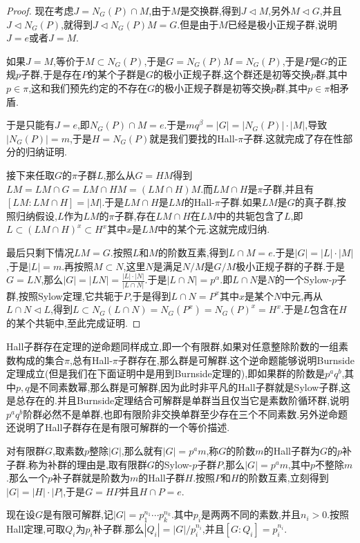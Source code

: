 \begin{proof}
	现在考虑$J=N_G(P)\cap M$,由于$M$是交换群,得到$J\triangleleft M$,另外$M\triangleleft G$,并且$J\triangleleft N_G(P)$,就得到$J\triangleleft N_G(P)M=G$.但是由于$M$已经是极小正规子群,说明$J={e}$或者$J=M$.
	
	如果$J=M$,等价于$M\subset N_G(P)$,于是$G=N_G(P)M=N_G(P)$,于是$P$是$G$的正规$p$子群,于是存在$P$的某个子群是$G$的极小正规子群,这个群还是初等交换$p$群,其中$p\in\pi$,这和我们预先约定的不存在$G$的极小正规子群是初等交换$p$群,其中$p\in\pi$相矛盾.
	
	于是只能有$J={e}$,即$N_G(P)\cap M={e}$.于是$mq^{\beta}=|G|=|N_G(P)|\cdot|M|$,导致$|N_G(P)|=m$,于是$H=N_G(P)$就是我们要找的Hall-$\pi$子群.这就完成了存在性部分的归纳证明.
	
	接下来任取$G$的$\pi$子群$L$,那么从$G=HM$得到$LM=LM\cap G=LM\cap HM=(LM\cap H)M$.而$LM\cap H$是$\pi$子群,并且有$[LM:LM\cap H]=|M|$.于是$LM\cap H$是$LM$的Hall-$\pi$子群.如果$LM$是$G$的真子群,按照归纳假设,$L$作为$LM$的$\pi$子群,存在$LM\cap H$在$LM$中的共轭包含了$L$,即$L\subset(LM\cap H)^x\subset H^x$其中$x$是$LM$中的某个元.这就完成归纳.
	
	最后只剩下情况$LM=G$.按照$L$和$M$的阶数互素,得到$L\cap M={e}$.于是$|G|=|L|\cdot|M|$,于是$|L|=m$.再按照$M\subset N$,这里$N$是满足$N/M$是$G/M$极小正规子群的子群.于是$G=LN$,那么$|G|=|LN|=\frac{|L|\cdot|N|}{|L\cap N|}$.于是$|L\cap N|=p^{\alpha}$.即$L\cap N$是$N$的一个Sylow-$p$子群,按照Sylow定理,它共轭于$P$,于是得到$L\cap N=P^x$其中$x$是某个$N$中元,再从$L\cap N\triangleleft L$,得到$L\subset N_G(L\cap N)=N_G(P^x)=N_G(P)^x=H^x$.于是$L$包含在$H$的某个共轭中,至此完成证明.
\end{proof}

Hall子群存在定理的逆命题同样成立,即一个有限群,如果对任意整除阶数的一组素数构成的集合$\pi$,总有Hall-$\pi$子群存在,那么群是可解群.这个逆命题能够说明Burnside定理成立(但是我们在下面证明中是用到Burnside定理的),即如果群的阶数是$p^aq^b$,其中$p,q$是不同素数幂,那么群是可解群,因为此时非平凡的Hall子群就是Sylow子群,这是总存在的.并且Burnside定理结合可解群是单群当且仅当它是素数阶循环群,说明$p^aq^b$阶群必然不是单群,也即有限阶非交换单群至少存在三个不同素数.另外逆命题还说明了Hall子群存在是有限可解群的一个等价描述.

对有限群$G$,取素数$p$整除$|G|$,那么就有$|G|=p^{a}m$,称$G$的阶数$m$的Hall子群为$G$的$p$补子群.称为补群的理由是,取有限群$G$的Sylow-$p$子群$P$,那么$|G|=p^am$,其中$p$不整除$m$.那么一个$p$补子群就是阶数为$m$的Hall子群$H$.按照$P$和$H$的阶数互素,立刻得到$|G|=|H|\cdot|P|$,于是$G=HP$并且$H\cap P={e}$.

现在设$G$是有限可解群,记$|G|=p_1^{n_1}\cdots p_k^{n_k}$.其中$p_i$是两两不同的素数,并且$n_i>0$.按照Hall定理,可取$Q_i$为$p_i$补子群.那么$|Q_i|=|G|/p_i^{n_i}$,并且$[G:Q_i]=p_i^{n_i}$.

